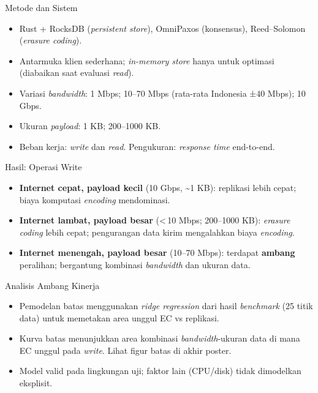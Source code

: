 \documentclass[a2,portrait]{config/poster/a0poster}
\newcommand{\postersection}[1]{%
	\begin{tcolorbox}[
		colback=MainBlue,
		colframe=MainBlue,
		fonttitle=\bfseries,
		coltext=white,
		sharp corners,
		boxrule=0pt,
		top=0pt,
		bottom=0pt,
		halign=center
	]
	\normalsize #1
	\end{tcolorbox}%
}
\begin{document}
\begin{multicols}{2}

\postersection{Metode dan Sistem}
\begin{itemize}
	\item Rust + RocksDB (\textit{persistent store}), OmniPaxos (konsensus), Reed–Solomon (\textit{erasure coding}).
	\item Antarmuka klien sederhana; \textit{in-memory store} hanya untuk optimasi (diabaikan saat evaluasi \textit{read}).
\end{itemize}
\begin{itemize}
	\item Variasi \textit{bandwidth}: 1 Mbps; 10–70 Mbps (rata-rata Indonesia ±40 Mbps); 10 Gbps.
	\item Ukuran \textit{payload}: 1 KB; 200–1000 KB.
	\item Beban kerja: \textit{write} dan \textit{read}. Pengukuran: \textit{response time} end-to-end.
\end{itemize}


\postersection{Hasil: Operasi Write}
\begin{itemize}
	\item \textbf{Internet cepat, payload kecil} (10 Gbps, \textasciitilde1 KB): replikasi lebih cepat; biaya komputasi \textit{encoding} mendominasi.
	\item \textbf{Internet lambat, payload besar} (\textless{}\,10 Mbps; 200–1000 KB): \textit{erasure coding} lebih cepat; pengurangan data kirim mengalahkan biaya \textit{encoding}.
	\item \textbf{Internet menengah, payload besar} (10–70 Mbps): terdapat \textbf{ambang} peralihan; bergantung kombinasi \textit{bandwidth} dan ukuran data.
\end{itemize}


\postersection{Analisis Ambang Kinerja}
\begin{itemize}
	\item Pemodelan batas menggunakan \textit{ridge regression} dari hasil \textit{benchmark} (25 titik data) untuk memetakan area unggul EC vs replikasi.
	\item Kurva batas menunjukkan area kombinasi \textit{bandwidth}-ukuran data di mana EC unggul pada \textit{write}. Lihat figur batas di akhir poster.
	\item Model valid pada lingkungan uji; faktor lain (CPU/disk) tidak dimodelkan eksplisit.
\end{itemize}


\end{multicols}
\end{document}
